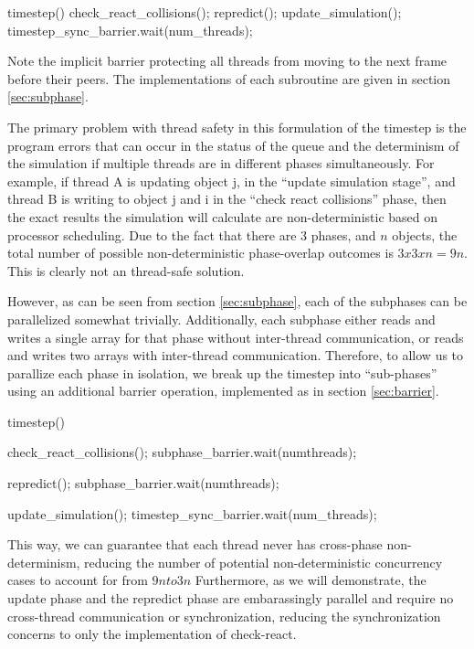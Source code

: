 \documentclass[conference]{IEEEtran}
\begin{document}
\begin{verbatimtab}[3]
timestep()
{
   check_react_collisions();
   repredict();
   update_simulation();
   timestep_sync_barrier.wait(num_threads);
}
\end{verbatimtab}

Note the implicit barrier protecting all threads from moving to the next frame before their peers.  The implementations of each subroutine are given in section \ref{sec:subphase}.

The primary problem with thread safety in this formulation of the timestep is the program errors that can occur in the status of the queue and the determinism of the simulation
if multiple threads are in different phases simultaneously.  For example, if thread A is updating object j, in the ``update simulation stage'', and thread B is writing to object 
j and i in the ``check react collisions'' phase, then the exact results the simulation will calculate are non-deterministic based on processor scheduling.  
Due to the fact that there are 3 phases, and $n$ objects, the total number of possible non-deterministic phase-overlap outcomes is $3x3xn=9n$.  This is clearly not an thread-safe solution.

However, as can be seen from section \ref{sec:subphase}, each of the subphases can be parallelized somewhat trivially.  Additionally, each subphase either reads and writes
a single array for that phase without inter-thread communication, or reads and writes two arrays with inter-thread communication.  Therefore, to allow us to parallize each
phase in isolation, we break up the timestep into ``sub-phases'' using an additional barrier operation, implemented as in section \ref{sec:barrier}.  

\begin{verbatimtab}[3]
timestep()
{
   check_react_collisions();
   subphase_barrier.wait(numthreads);

   repredict();
   subphase_barrier.wait(numthreads);

   update_simulation();
   timestep_sync_barrier.wait(num_threads);
}
\end{verbatimtab}

This way, we can guarantee that each thread never has cross-phase non-determinism, reducing the number of potential non-deterministic concurrency cases to account for from $9n to 3n$
Furthermore, as we will demonstrate, the update phase and the repredict phase are embarassingly parallel and require no cross-thread communication or synchronization,
reducing the synchronization concerns to only the implementation of check-react.
\end{document}
